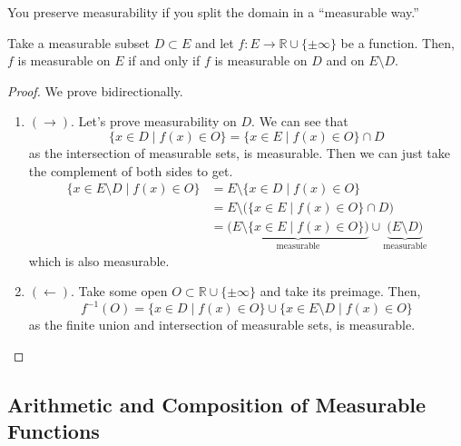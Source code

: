   You preserve measurability if you split the domain in a ``measurable way.'' 

  \begin{theorem}
    \label{thm:measurable-partition}
    Take a measurable subset $D \subset E$ and let $f: E \to \mathbb{R} \cup \{\pm\infty\}$ be a function. Then, $f$ is measurable on $E$ if and only if $f$ is measurable on $D$ and on $E \setminus D$. 
  \end{theorem}
  \begin{proof}
    We prove bidirectionally. 
    \begin{enumerate}
      \item $(\rightarrow)$. Let's prove measurability on $D$. We can see that 
      \begin{equation}
        \{x \in D \mid f(x) \in O \} = \{x \in E \mid f(x) \in O \} \cap D
      \end{equation}
      as the intersection of measurable sets, is measurable. Then we can just take the complement of both sides to get. 
      \begin{align}
        \{x \in E \setminus D \mid f(x) \in O\} 
          & = E \setminus \{x \in D \mid f(x) \in O \} \\ 
          & = E \setminus \big( \{x \in E \mid f(x) \in O \} \cap D \big) \\
          & = \underbrace{\big( E \setminus \{x \in E \mid f(x) \in O \} \big)}_{\text{measurable}} \cup \underbrace{\big( E \setminus D \big)}_{\text{measurable}}
      \end{align}
      which is also measurable. 

      \item $(\leftarrow)$. Take some open $O \subset \mathbb{R} \cup \{\pm\infty\}$ and take its preimage. Then, 
      \begin{equation}
        f^{-1} (O) = \{x \in D \mid f(x) \in O\} \cup \{x \in E \setminus D \mid f(x) \in O \}
      \end{equation} 
      as the finite union and intersection of measurable sets, is measurable. 
    \end{enumerate}
  \end{proof}

\subsection{Arithmetic and Composition of Measurable Functions}

